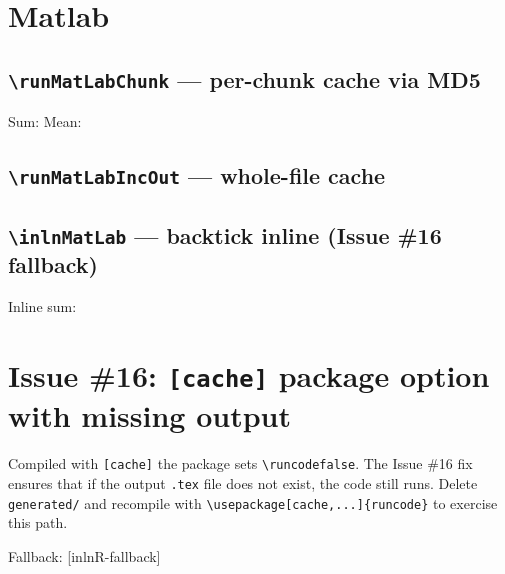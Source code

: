 \documentclass[12pt]{article}
\newif\ifuseMatlab\useMatlabfalse
\begin{document}
\section{Matlab}

\subsection{\texttt{\textbackslash runMatLabChunk} — per-chunk cache via MD5}

Sum:  
Mean: 

\subsection{\texttt{\textbackslash runMatLabIncOut} — whole-file cache}


\subsection{\texttt{\textbackslash inlnMatLab} — backtick inline (Issue \#16 fallback)}

Inline sum: 

\fi %

\section{Issue \#16: \texttt{[cache]} package option with missing output}

Compiled with \texttt{[cache]} the package sets \texttt{\textbackslash runcodefalse}.
The Issue \#16 fix ensures that if the output \texttt{.tex} file does not exist,
the code still runs.  Delete \texttt{generated/} and recompile with
\texttt{\textbackslash usepackage[cache,...]\{runcode\}} to exercise this path.

Fallback: [inlnR-fallback]
\end{document}
